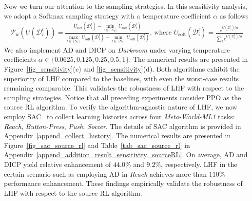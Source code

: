 \documentclass{article}
\def\ccalD{{\ensuremath{\mathcal D}}}
\begin{document}
Now we turn our attention to the sampling strategies. In this sensitivity analysis, we adopt a Softmax sampling strategy with a temperature coefficient $\alpha$ as follows
\begin{align}\label{eqn_softmax_weight_func}
    \mathcal{P}_{\bar{w}}(U(\ccalD_i^l)) = \frac{U_\text{soft}(\ccalD_i^l) - \min_{l \in [N_l]} U_\text{soft}(\ccalD_i^l)}{\max_{l \in [N_l]} U_\text{soft}(\ccalD_i^l) - \min_{l \in [N_l]} U_\text{soft}(\ccalD_i^l)}, \, \text{where} \,\,  U_\text{soft}(\ccalD_i^l) = \frac{e^{U(\ccalD_i^l) / \alpha}}{\sum_l e^{U(\ccalD_i^l) / \alpha}}
\end{align}
We also implement AD and DICP on \textit{Darkroom} under varying temperature coefficients $\alpha \in \{0.0625, 0.125, 0.25, 0.5, 1\}$. The numerical results are presented in Figure~\ref{fig_sensitivity}(c) and \ref{fig_sensitivity}(d).
Both algorithms exhibit the superiority of LHF compared to the baselines, with even the worst-case results remaining comparable. This validates the robustness of LHF with respect to the sampling strategies.
Notice that all preceding experiments consider PPO as the source RL algorithm. To verify the algorithm-agnostic nature of LHF, we now employ SAC~\cite{haarnoja2018soft} to collect learning histories across four \textit{Meta-World-ML1} tasks: \textit{Reach}, \textit{Button-Press}, \textit{Push}, \textit{Soccer}. The details of SAC algorithm is provided in Appendix~\ref{append_collect_history}.
The numerical results are presented in Figure~\ref{fig_sac_source_rl} and Table~\ref{tab_sac_source_rl} in Appendix~\ref{append_addition_result_sensitivity_sourceRL}.
On average, AD and DICP yield relative enhancement of $44.0\%$ and $9.2\%$, respectively. LHF in the certain scenario such as employing AD in \textit{Reach} achieves more than $110\%$ performance enhancement. These findings empirically validate the robustness of LHF with respect to the source RL algorithm.
\end{document}
